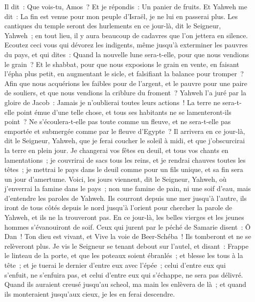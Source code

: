 \begin{multicols}{2}
Il dit~: Que vois-tu, Amos~? Et je répondis~: Un panier de fruits. Et Yahweh me dit~: La fin est venue pour mon peuple d'Israël, je ne lui en passerai plus.
Les cantiques du temple seront des hurlements en ce jour-là, dit le Seigneur, Yahweh~; en tout lieu, il y aura beaucoup de cadavres que l'on jettera en silence.
Ecoutez ceci vous qui dévorez les indigents, même jusqu'à exterminer les pauvres du pays,
et qui dites~: Quand la nouvelle lune sera-t-elle, pour que nous vendions le grain~? Et le shabbat, pour que nous exposions le grain en vente, en faisant l'épha plus petit, en augmentant le sicle, et falsifiant la balance pour tromper~?
Afin que nous acquérions les faibles pour de l'argent, et le pauvre pour une paire de souliers, et que nous vendions la criblure du froment~?
Yahweh l'a juré par la gloire de Jacob~: Jamais je n'oublierai toutes leurs actions~!
La terre ne sera-t-elle point émue d'une telle chose, et tous ses habitants ne se lamenteront-ils point~? Ne s'écoulera-t-elle pas toute comme un fleuve, et ne sera-t-elle pas emportée et submergée comme par le fleuve d'Egypte~? 
Il arrivera en ce jour-là, dit le Seigneur, Yahweh, que je ferai coucher le soleil à midi, et que j'obscurcirai la terre en plein jour.
Je changerai vos fêtes en deuil, et tous vos chants en lamentations~; je couvrirai de sacs tous les reins, et je rendrai chauves toutes les têtes~; je mettrai le pays dans le deuil comme pour un fils unique, et sa fin sera un jour d'amertume.
Voici, les jours viennent, dit le Seigneur, Yahweh, où j'enverrai la famine dans le pays~; non une famine de pain, ni une soif d'eau, mais d'entendre les paroles de Yahweh.
Ils courront depuis une mer jusqu'à l'autre, ils iront de tous côtés depuis le nord jusqu'à l'orient pour chercher la parole de Yahweh, et ils ne la trouveront pas.
En ce jour-là, les belles vierges et les jeunes hommes s'évanouiront de soif.
Ceux qui jurent par le péché de Samarie disent~: Ô Dan~! Ton dieu est vivant, et Vive la voie de Beer-Schéba~! Ils tomberont et ne se relèveront plus.
\VerseOne{}Je vis le Seigneur se tenant debout sur l'autel, et disant~: Frappe le linteau de la porte, et que les poteaux soient ébranlés~; et blesse les tous à la tête~; et je tuerai le dernier d'entre eux avec l'épée~; celui d'entre eux qui s'enfuit, ne s'enfuira pas, et celui d'entre eux qui s'échappe, ne sera pas délivré.
Quand ils auraient creusé jusqu'au scheol, ma main les enlèvera de là~; et quand ils monteraient jusqu'aux cieux, je les en ferai descendre.

\end{multicols}
